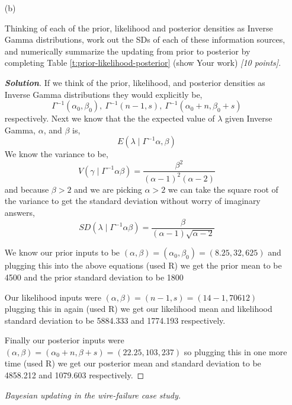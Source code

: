 \documentclass[12pt]{article}
\newenvironment{solution}{\begin{proof}[\textbf{\textit{Solution}}] }{\end{proof}}
\begin{document}
\begin{itemize}
\begin{itemize}
\begin{itemize}
\newpage
\item[(b)] 

Thinking of each of the prior, likelihood and posterior densities as Inverse Gamma distributions, work out the SDs of each of these information sources, and numerically summarize 	the updating from prior to posterior by completing Table \ref{t:prior-likelihood-posterior} (show Your work) \textit{[10 points]}.
\begin{tcolorbox}[breakable]
    \begin{solution}
        If we think of the prior, likelihood, and posterior densities as Inverse Gamma distributions they would explicitly be, 
        \[\Gamma^{-1}(\alpha_0, \beta_0), \ \Gamma^{-1}(n-1, s), \ \Gamma^{-1}(\alpha_0 + n, \beta_0 + s)\]
        respectively. Next we know that the the expected value of $\lambda$ given Inverse Gamma, $\alpha$, and $\beta$ is,
        \[E(\lambda \mid \Gamma^{-1}\alpha,\beta)\]
        We know the variance to be,
        \[V(\gamma \mid \Gamma^{-1}\alpha\beta) = \frac{\beta^{2}}{(\alpha -1)^{2}(\alpha -2)}\]
        and because $\beta > 2$ and we are picking $\alpha > 2$ we can take the square root of the variance to get the standard deviation without worry of imaginary answers,
        \[SD(\lambda \mid \Gamma^{-1}\alpha \beta) = \frac{\beta}{(\alpha - 1)\sqrt{\alpha - 2}}\]
    
        We know our prior inputs to be $(\alpha,\beta) = (\alpha_0,\beta_0) = (8.25, 32,625)$ and plugging this into the above equations (used R) we get the prior mean to be 4500 and the prior standard deviation to be 1800
    
        Our likelihood inputs were $(\alpha, \beta) = (n-1,s) = (14 -1, 70612)$ plugging this in again (used R) we get our likelihood mean and likelihood standard deviation to be 5884.333 and 1774.193 respectively. 
    
        Finally our posterior inputs were $(\alpha, \beta) = (\alpha_0 + n, \beta + s) = (22.25, 103,237)$ so plugging this in one more time (used R) we get our posterior mean and standard deviation to be 4858.212 and 1079.603 respectively. 
    \end{solution}
\end{tcolorbox}


\bigskip

\begin{table}[t!]

\centering

\caption{\textit{Bayesian updating in the wire-failure case study.}}


\end{table}
\end{itemize}
\end{itemize}
\end{itemize}
\end{document}
